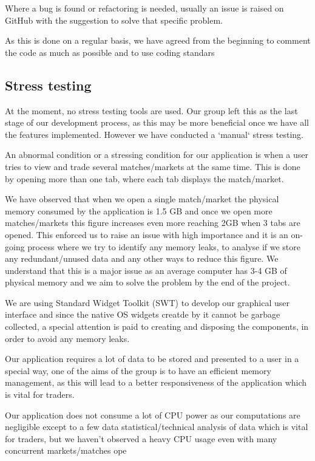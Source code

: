 \documentclass[10pt]{article}
\begin{document}
Where a bug is found or refactoring is needed, usually an issue is raised on GitHub with the suggestion to solve that specific problem.

As this is done on a regular basis, we have agreed from the beginning to comment the code as much as possible and to use coding standars

\subsection{Stress testing}

At the moment, no stress testing tools are used. Our group left this as the last stage of our development process, as this may be more beneficial once we have all the features implemented.
However we have conducted a `manual` stress testing.

An abnormal condition or a stressing condition for our application is when a user tries to view and trade several matches/markets at the same time. This is done by opening more than one tab, where each tab displays the match/market.

We have observed that when we open a single match/market the physical memory consumed by the application is 1.5 GB and once we open more matches/markets this figure increases even more reaching 2GB when 3 tabs are opened. This enforced us to raise an issue with high importance and it is an on-going process where we try to identify any memory leaks, to analyse if we store any redundant/unused data and any other ways to reduce this figure. We understand that this is a major issue as an average computer has 3-4 GB of physical memory and we aim to solve the problem by the end of the project.

We are using Standard Widget Toolkit (SWT) to develop our graphical user interface and since the native OS widgets creatde by it cannot be garbage collected, a special attention is paid to creating and disposing the components, in order to avoid any memory leaks.

Our application requires a lot of data to be stored and presented to a user in a special way, one of the aims of the group is to have an efficient memory management, as this will lead to a better responsiveness of the application which is vital for traders.

Our application does not consume a lot of CPU power as our computations are negligible except to a few data statistical/technical analysis of data which is vital for traders, but we haven’t observed a heavy CPU usage even with many concurrent markets/matches ope
\end{document}
